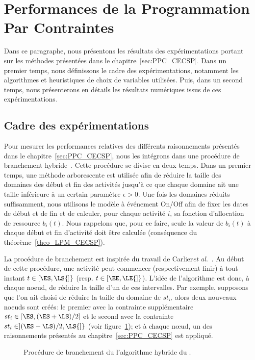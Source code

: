 \section{Performances de la Programmation Par Contraintes}
\label{sec:expe_PPC}
Dans ce paragraphe, nous présentons les résultats des expérimentations
portant sur les méthodes présentées dans le
chapitre~\ref{sec:PPC_CECSP}. Dans un premier temps, nous définissons
le cadre des expérimentations, notamment les algorithmes et
heuristiques de choix de variables utilisées. Puis, dans un second
temps, nous présenterons en détails les résultats numériques issus de
ces expérimentations. 

\subsection{Cadre des expérimentations}
\label{sec:hybridBB}
Pour mesurer les performances relatives des différents raisonnements
présentés dans le chapitre~\ref{sec:PPC_CECSP}, nous les intégrons
dans une procédure de branchement
hybride~\cite{Nattaf_Constraints,Nattaf_ORSpectrum}. Cette procédure
se divise en deux temps. Dans un premier temps, une méthode 
arborescente est utilisée afin de réduire la taille des domaines des
début et fin des activités jusqu'à ce que chaque domaine ait une
taille inférieure à un certain paramètre $\epsilon >0$. Une fois les
domaines réduits suffisamment, nous utilisons le modèle à événement
On/Off afin de fixer les dates de début et de fin et de calculer, pour
chaque activité $i$, sa fonction d'allocation de ressource
$b_i(t)$. Nous rappelons que, pour ce faire, seule la valeur de
$b_i(t)$ à chaque début et fin d'activité doit être calculée
(conséquence du théorème~\ref{theo_LPM_CECSP}).

La procédure de branchement est inspirée du travail de Carlier{\it et
  al.}~\cite{Carlier}. Au début de cette procédure, une activité peut
commencer (respectivement finir) à tout instant $t \in [\ES,\LS{]}$
(resp. $t \in [\EE,\LE{]}$). L'idée de l'algorithme est donc, à chaque
noeud, de réduire la taille d'un de ces intervalles. Par exemple,
supposons que l'on ait choisi de réduire la taille du domaine de
$st_i$, alors deux nouveaux noeuds sont créés: le premier avec la
contrainte supplémentaire $st_i \in [\ES , (\ES+\LS) / 2]$ et le
second avec la contrainte $st_i \in ](\ES+\LS) / 2,\LS{]}$ (voir
figure~\ref{fig:branching}); et à chaque n\oe ud, un des raisonnements
présentés au chapitre~\ref{sec:PPC_CECSP} est appliqué.

\begin{figure}[!htb] 
  
  \caption{Procédure de branchement du l'algorithme hybride du \CECSP.}
  \label{fig:branching}
\end{figure}

